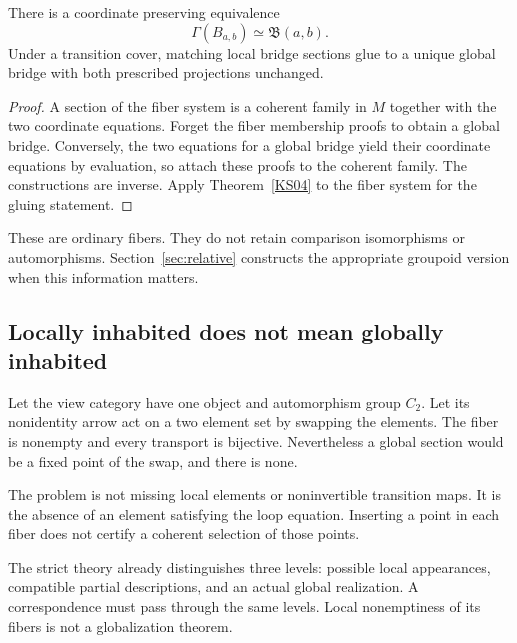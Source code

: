 \begin{theorem}\label{KS06}
There is a coordinate preserving equivalence
\[
 \Gamma(B_{a,b})\simeq\mathfrak B(a,b).
\]
Under a transition cover, matching local bridge sections glue to a unique global bridge with both prescribed projections unchanged.
\end{theorem}
\begin{proof}
A section of the fiber system is a coherent family in \(M\) together with the two coordinate equations. Forget the fiber membership proofs to obtain a global bridge. Conversely, the two equations for a global bridge yield their coordinate equations by evaluation, so attach these proofs to the coherent family. The constructions are inverse. Apply Theorem~\ref{KS04} to the fiber system for the gluing statement.
\end{proof}
These are ordinary fibers. They do not retain comparison isomorphisms or automorphisms. Section~\ref{sec:relative} constructs the appropriate groupoid version when this information matters.

\subsection{Locally inhabited does not mean globally inhabited}
\begin{example}\label{KS07}
Let the view category have one object and automorphism group \(C_2\). Let its nonidentity arrow act on a two element set by swapping the elements. The fiber is nonempty and every transport is bijective. Nevertheless a global section would be a fixed point of the swap, and there is none.
\end{example}
The problem is not missing local elements or noninvertible transition maps. It is the absence of an element satisfying the loop equation. Inserting a point in each fiber does not certify a coherent selection of those points.

\begin{insight}
The strict theory already distinguishes three levels: possible local appearances, compatible partial descriptions, and an actual global realization. A correspondence must pass through the same levels. Local nonemptiness of its fibers is not a globalization theorem.
\end{insight}
